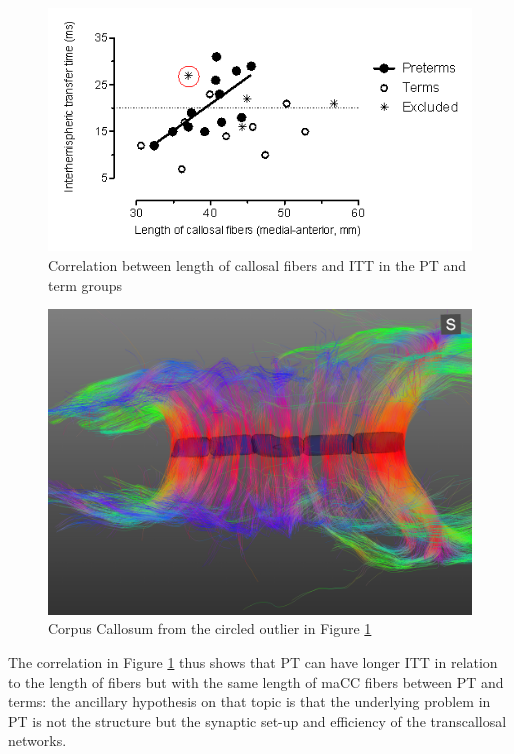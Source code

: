 \documentclass[twocolumn]{svjour3}
\begin{document}
\begin{figure}
	\centering
		\includegraphics[width=\linewidth]{cyril_plot}
	\caption{Correlation between length of callosal fibers and ITT in the PT and term groups}
	\label{fig_cyril_1}
\end{figure}

\begin{figure}
	\centering
		\includegraphics[width=\linewidth]{cc_cyril}
	\caption{Corpus Callosum from the circled outlier in Figure \ref{fig_cyril_1}}
	\label{fig_cyril_2}
\end{figure}

The correlation in Figure \ref{fig_cyril_1} thus shows that PT can have longer ITT in relation to the length of fibers but with the same length of maCC fibers between PT and terms: the ancillary hypothesis on that topic is that the underlying problem in PT is not the structure but the synaptic set-up and efficiency of the transcallosal networks.
\end{document}
